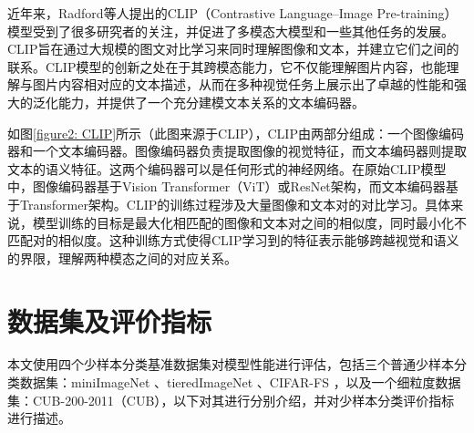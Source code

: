 近年来，Radford等人\cite{Clip}提出的CLIP（Contrastive Language–Image Pre-training）模型受到了很多研究者的关注，并促进了多模态大模型和一些其他任务的发展。CLIP旨在通过大规模的图文对比学习来同时理解图像和文本，并建立它们之间的联系。CLIP模型的创新之处在于其跨模态能力，它不仅能理解图片内容，也能理解与图片内容相对应的文本描述，从而在多种视觉任务上展示出了卓越的性能和强大的泛化能力，并提供了一个充分建模文本关系的文本编码器。

如图\ref{figure2: CLIP}所示（此图来源于CLIP\cite{Clip}），CLIP由两部分组成：一个图像编码器和一个文本编码器。图像编码器负责提取图像的视觉特征，而文本编码器则提取文本的语义特征。这两个编码器可以是任何形式的神经网络。在原始CLIP模型中，图像编码器基于Vision Transformer（ViT）或ResNet架构，而文本编码器基于Transformer架构。CLIP的训练过程涉及大量图像和文本对的对比学习。具体来说，模型训练的目标是最大化相匹配的图像和文本对之间的相似度，同时最小化不匹配对的相似度。这种训练方式使得CLIP学习到的特征表示能够跨越视觉和语义的界限，理解两种模态之间的对应关系。

\section[\hspace{-2pt}数据集及评价指标]{{\heiti{} \hspace{-8pt}数据集及评价指标}}\label{section2: 数据集及评价指标}

本文使用四个少样本分类基准数据集对模型性能进行评估，包括三个普通少样本分类数据集：miniImageNet \cite{vinyals2016matching}、tieredImageNet \cite{ren2018meta}、CIFAR-FS \cite{bertinetto2019meta}，以及一个细粒度数据集：CUB-200-2011（CUB）\cite{wah2011caltech}，以下对其进行分别介绍，并对少样本分类评价指标进行描述。

